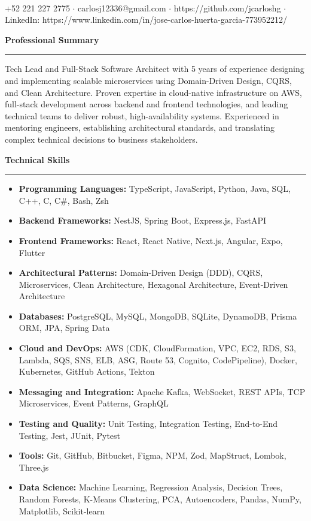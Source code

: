 \documentclass[10pt]{article}
\renewcommand{\section}[1]{%
    \vspace{6pt}
    {\large\bfseries #1}
    \vspace{2pt}
    \hrule
    \vspace{4pt}
}
\begin{document}
\\
\vspace{2pt}
+52 221 227 2775 $\cdot$ carlosj12336@gmail.com $\cdot$ https://github.com/jcarloshg $\cdot$ LinkedIn: https://www.linkedin.com/in/jose-carlos-huerta-garcia-773952212/

\section{Professional Summary}

Tech Lead and Full-Stack Software Architect with 5 years of experience designing and implementing scalable microservices using Domain-Driven Design, CQRS, and Clean Architecture. Proven expertise in cloud-native infrastructure on AWS, full-stack development across backend and frontend technologies, and leading technical teams to deliver robust, high-availability systems. Experienced in mentoring engineers, establishing architectural standards, and translating complex technical decisions to business stakeholders.

\section{Technical Skills}

\begin{itemize}[leftmargin=*]
    \item \textbf{Programming Languages:} TypeScript, JavaScript, Python, Java, SQL, C++, C, C\#, Bash, Zsh
    \item \textbf{Backend Frameworks:} NestJS, Spring Boot, Express.js, FastAPI
    \item \textbf{Frontend Frameworks:} React, React Native, Next.js, Angular, Expo, Flutter
    \item \textbf{Architectural Patterns:} Domain-Driven Design (DDD), CQRS, Microservices, Clean Architecture, Hexagonal Architecture, Event-Driven Architecture
    \item \textbf{Databases:} PostgreSQL, MySQL, MongoDB, SQLite, DynamoDB, Prisma ORM, JPA, Spring Data
    \item \textbf{Cloud and DevOps:} AWS (CDK, CloudFormation, VPC, EC2, RDS, S3, Lambda, SQS, SNS, ELB, ASG, Route 53, Cognito, CodePipeline), Docker, Kubernetes, GitHub Actions, Tekton
    \item \textbf{Messaging and Integration:} Apache Kafka, WebSocket, REST APIs, TCP Microservices, Event Patterns, GraphQL
    \item \textbf{Testing and Quality:} Unit Testing, Integration Testing, End-to-End Testing, Jest, JUnit, Pytest
    \item \textbf{Tools:} Git, GitHub, Bitbucket, Figma, NPM, Zod, MapStruct, Lombok, Three.js
    \item \textbf{Data Science:} Machine Learning, Regression Analysis, Decision Trees, Random Forests, K-Means Clustering, PCA, Autoencoders, Pandas, NumPy, Matplotlib, Scikit-learn
\end{itemize}
\end{document}
